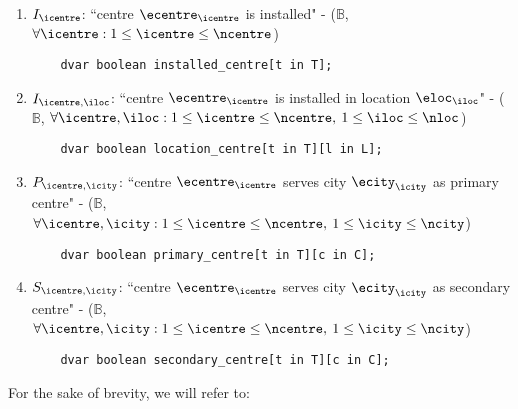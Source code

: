 \begin{enumerate}
    \item $I_\icentre$: ``centre $\ecentre_\icentre$ is installed" -
    ($\mathbb{B}$, $\forall \icentre: 1 \le \icentre \le \ncentre$)
    \label{dec-var:centre-installed}
        
    \begin{lstlisting}
    dvar boolean installed_centre[t in T];
    \end{lstlisting}
    
    \item $I_{\icentre, \iloc}$: ``centre $\ecentre_\icentre$ is installed in location
    $\eloc_\iloc$" - ($\mathbb{B}$, $\forall \icentre, \iloc: 1 \le \icentre \le \ncentre,\:
    1 \le \iloc \le \nloc$)
    \label{dec-var:centre-location}
    
    \begin{lstlisting}
    dvar boolean location_centre[t in T][l in L];
    \end{lstlisting}

    \item $P_{\icentre, \icity}$: ``centre $\ecentre_\icentre$ serves city $\ecity_\icity$ as
    primary centre" - ($\mathbb{B}$, $\forall \icentre, \icity: 1 \le \icentre \le \ncentre,\:
    1 \le \icity \le \ncity$)
    \label{dec-var:primary-centre-city}
    
    \begin{lstlisting}
    dvar boolean primary_centre[t in T][c in C];
    \end{lstlisting}

    \item $S_{\icentre, \icity}$: ``centre $\ecentre_\icentre$ serves city $\ecity_\icity$ as
    secondary centre" - ($\mathbb{B}$, $\forall \icentre, \icity: 1 \le \icentre \le \ncentre,\:
    1 \le \icity \le \ncity$)
    \label{dec-var:secondary-centre-city}
    
    \begin{lstlisting}
    dvar boolean secondary_centre[t in T][c in C];
    \end{lstlisting}

\end{enumerate}

For the sake of brevity, we will refer to:

